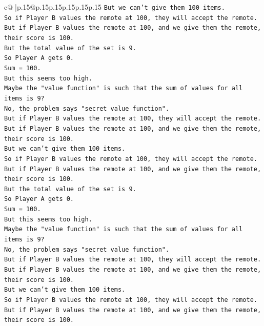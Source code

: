 \documentclass{article}
\begin{document}
{\begin{supertabular}{c@{$\;$}|p{.15\linewidth}@{}p{.15\linewidth}p{.15\linewidth}p{.15\linewidth}p{.15\linewidth}p{.15\linewidth}}
{{{\texttt{But we can't give them 100 items.} \\
\texttt{So if Player B values the remote at 100, they will accept the remote.} \\
\texttt{But if Player B values the remote at 100, and we give them the remote, their score is 100.} \\
\texttt{But the total value of the set is 9.} \\
\texttt{So Player A gets 0.} \\
\texttt{Sum = 100.} \\
\texttt{But this seems too high.} \\
\texttt{Maybe the "value function" is such that the sum of values for all items is 9?} \\
\texttt{No, the problem says "secret value function".} \\
\texttt{But if Player B values the remote at 100, they will accept the remote.} \\
\texttt{But if Player B values the remote at 100, and we give them the remote, their score is 100.} \\
\texttt{But we can't give them 100 items.} \\
\texttt{So if Player B values the remote at 100, they will accept the remote.} \\
\texttt{But if Player B values the remote at 100, and we give them the remote, their score is 100.} \\
\texttt{But the total value of the set is 9.} \\
\texttt{So Player A gets 0.} \\
\texttt{Sum = 100.} \\
\texttt{But this seems too high.} \\
\texttt{Maybe the "value function" is such that the sum of values for all items is 9?} \\
\texttt{No, the problem says "secret value function".} \\
\texttt{But if Player B values the remote at 100, they will accept the remote.} \\
\texttt{But if Player B values the remote at 100, and we give them the remote, their score is 100.} \\
\texttt{But we can't give them 100 items.} \\
\texttt{So if Player B values the remote at 100, they will accept the remote.} \\
\texttt{But if Player B values the remote at 100, and we give them the remote, their score is 100.} \\
}}}
\end{supertabular}}
\end{document}
